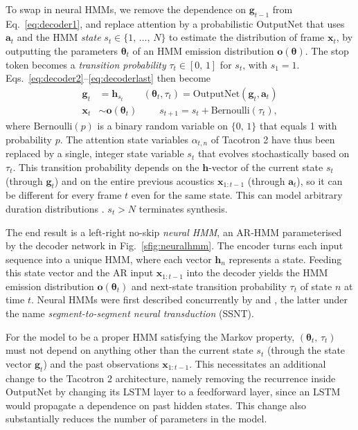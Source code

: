 \documentclass[british]{article}
\newcommand{\bb}[1]{\boldsymbol{#1}}
\newcommand{\seq}[1]{#1} \newcommand{\est}[1]{\widehat{#1}}
\newcommand{\x}{\boldsymbol{x}}
\newcommand{\xseq}{\seq{\x}}
\newcommand{\btheta}{\bb{\theta}}
\newcommand{\topdecoder}{OutputNet}
\begin{document}
To swap in neural HMMs, we remove
the dependence on $\bb{g}_{t-1}$ from Eq.\ \eqref{eq:decoder1}, and replace attention by a probabilistic $\mathrm{\topdecoder{}}$ that uses $\bb{a}_{t}$ and the HMM \emph{state} $s_t\in\{1,\,\ldots,\,N\}$ to estimate the distribution of
frame $\x_t$, by outputting the parameters $\btheta_t$ of an HMM emission distribution $\bb{o}(\btheta)$.
The stop token becomes a \emph{transition probability} $\tau_t\in[0,\,1]$ for $s_t$, 
with $s_1=1$.
Eqs.\ \eqref{eq:decoder2}--\eqref{eq:decoderlast} then become
\begin{align}
\bb{g}_t & = \bb{h}_{s_t} \label{eq:neural1} \qquad{}(\btheta_t,\tau_t) = \mathrm{\topdecoder{}}(\bb{g}_t,\bb{a}_t) \\
\x_t & \sim \bb{o}(\btheta_t) \qquad{}\;s_{t+1} = s_{t} + \mathrm{Bernoulli}(\tau_t) \label{eq:neurallast}
\text{,}
\end{align}
where $\mathrm{Bernoulli}(p)$ is a binary random variable on $\{0,\,1\}$ that equals 1 with probability $p$.
The attention state variables $\alpha_{t,n}$ of Tacotron 2 have thus been replaced by a single, integer state variable $s_t$ that evolves stochastically based on $\tau_t$.
This transition probability depends on the $\bb{h}$-vector of the current state $s_t$ (through $\bb{g}_t$) and on the entire previous acoustics $\xseq_{1:t-1}$ (through $\bb{a}_t$), so it can be different for every frame $t$ even for the same state.
This can model arbitrary duration distributions \cite{ronanki2016median}.
$s_{t}>N$ terminates synthesis.

The end result is a left-right no-skip \emph{neural HMM}, an AR-HMM parameterised by the decoder network in Fig.\ \ref{sfig:neuralhmm}.
The encoder turns each input sequence
into a unique HMM, where each vector $\bb{h}_n$ represents a state.
Feeding this state vector and the AR input $\xseq_{1:t-1}$ into the decoder yields the HMM emission distribution $\bb{o}(\btheta_t)$ and next-state transition probability $\tau_t$ of state $n$ at time $t$.
Neural HMMs were first described concurrently by \cite{tran2016unsupervised} and \cite{yu2016online}, the latter under the name \emph{segment-to-segment neural transduction} (SSNT).


For the model to be a proper HMM satisfying the Markov property, $(\btheta_t,\,\tau_t)$ must not depend on anything other than the current state $s_t$ (through the state vector $\bb{g}_t$) and the past observations $\xseq_{1:t-1}$.
This necessitates an additional change to the Tacotron 2 architecture, namely removing the recurrence inside $\mathrm{\topdecoder{}}$ by changing its LSTM layer to a feedforward layer, since
an LSTM would propagate a dependence on past hidden states.
This change also substantially reduces the number of parameters in the model.
\end{document}
